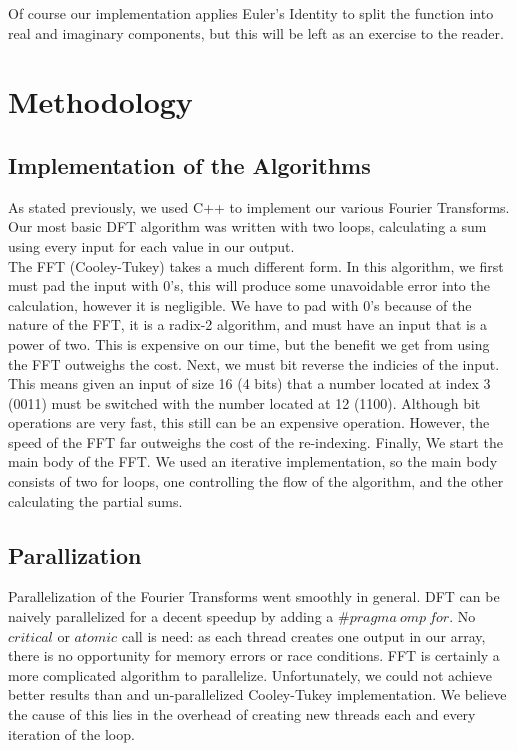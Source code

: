 \documentclass[12pt]{extarticle}
\begin{document}
    Of course our implementation applies Euler's Identity to split the function into real and imaginary components, but this will be left as an exercise to the reader.

\section*{Methodology}

	\subsection*{Implementation of the Algorithms}
		As stated previously, we used C++ to implement our various Fourier Transforms.
		Our most basic DFT algorithm was written with two loops, calculating a sum using every input for each value in our output.
		\\

		The FFT (Cooley-Tukey) takes a much different form.
		In this algorithm, we first must pad the input with 0's, this will produce some unavoidable error into the calculation, however it is negligible.
		We have to pad with 0's because of the nature of the FFT, it is a radix-2 algorithm, and must have an input that is a power of two.
		This is expensive on our time, but the benefit we get from using the FFT outweighs the cost.
		Next, we must bit reverse the indicies of the input.
		This means given an input of size 16 (4 bits) that a number located at index 3 (0011) must be switched with the number located at 12 (1100).
		Although bit operations are very fast, this still can be an expensive operation. 
		However, the speed of the FFT far outweighs the cost of the re-indexing.
		Finally, We start the main body of the FFT.
		We used an iterative implementation, so the main body consists of two for loops, one controlling the flow of the algorithm, and the other calculating the partial sums.

\subsection*{Parallization} 
    Parallelization of the Fourier Transforms went smoothly in general.
    DFT can be naively parallelized for a decent speedup by adding a $\#pragma\ omp\ for$.
    No $critical$ or $atomic$ call is need: as each thread creates one output in our array, there is no opportunity for memory errors or race conditions.
    FFT is certainly a more complicated algorithm to parallelize. 
    Unfortunately, we could not achieve better results than and un-parallelized Cooley-Tukey implementation.
    We believe the cause of this lies in the overhead of creating new threads each and every iteration of the loop.
   
\end{document}
